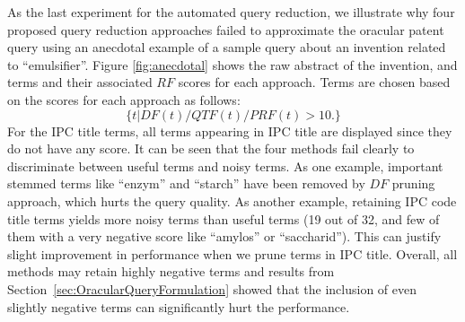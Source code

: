 As the last experiment for the automated query reduction, we illustrate why four proposed query reduction approaches failed to approximate the oracular patent query using an anecdotal example of a sample query about an invention related to ``emulsifier''. 
Figure \ref{fig:anecdotal} shows the raw abstract of the invention, and terms and their associated $\mathit{RF}$ scores for each approach. 
Terms are chosen based on the scores for each approach as follows: 
\begin{displaymath}\{t| DF(t)/QTF(t)/PRF(t)>10.\}\end{displaymath}
For the IPC title terms, all terms appearing in IPC title are displayed since they do not have any score.   
It can be seen that the four methods fail clearly to discriminate between useful terms and noisy terms. As one example, important stemmed terms like ``enzym'' and ``starch'' have been removed by $\mathit{DF}$ pruning approach, which hurts the query quality.  As another example, retaining IPC code title terms yields more noisy terms than useful terms (19 out of 32, and few of them with a very negative score like ``amylos'' or ``saccharid''). This can justify slight improvement in performance when we prune terms in IPC title. Overall, all methods may retain highly negative terms and results from Section~\ref{sec:OracularQueryFormulation} showed that the inclusion of even slightly negative terms can significantly hurt the performance.
